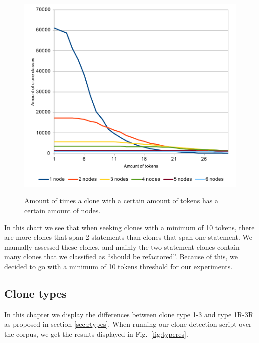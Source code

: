 \documentclass[a4paper]{article}
\begin{document}
\begin{figure}[H]
  \caption{Amount of times a clone with a certain amount of tokens has a certain amount of nodes.}
    \includegraphics[width=1\columnwidth]{img/TokenThreshold}
  \label{fig:tokenthreshold}
\end{figure}

In this chart we see that when seeking clones with a minimum of 10 tokens, there are more clones that span 2 statements than clones that span one statement. We manually assessed these clones, and mainly the two-statement clones contain many clones that we classified as ``should be refactored''. Because of this, we decided to go with a minimum of 10 tokens threshold for our experiments.

\subsection{Clone types}
In this chapter we display the differences between clone type 1-3 \cite{roy2007survey} and type 1R-3R as proposed in section \ref{sec:rtypes}. When running our clone detection script over the corpus, we get the results displayed in Fig.~\ref{fig:typeres}.
\end{document}

